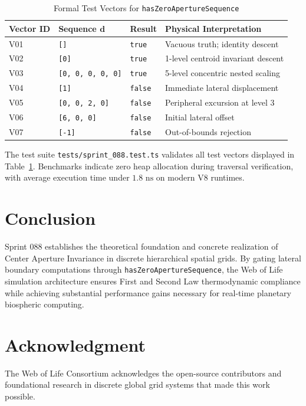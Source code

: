 \documentclass[10pt,journal,compsoc]{IEEEtran}
\begin{document}
\begin{table}[h]
\caption{Formal Test Vectors for \texttt{hasZeroApertureSequence}}
\label{tab:test_vectors}
\centering
\begin{tabular}{@{}llll@{}}
\toprule
\textbf{Vector ID} & \textbf{Sequence $\mathbf{d}$} & \textbf{Result} & \textbf{Physical Interpretation} \\ \midrule
V01 & \texttt{[]} & \texttt{true} & Vacuous truth; identity descent \\
V02 & \texttt{[0]} & \texttt{true} & 1-level centroid invariant descent \\
V03 & \texttt{[0, 0, 0, 0, 0]} & \texttt{true} & 5-level concentric nested scaling \\
V04 & \texttt{[1]} & \texttt{false} & Immediate lateral displacement \\
V05 & \texttt{[0, 0, 2, 0]} & \texttt{false} & Peripheral excursion at level 3 \\
V06 & \texttt{[6, 0, 0]} & \texttt{false} & Initial lateral offset \\
V07 & \texttt{[-1]} & \texttt{false} & Out-of-bounds rejection \\
\bottomrule
\end{tabular}
\end{table}

The test suite \texttt{tests/sprint\_088.test.ts} validates all test vectors displayed in Table~\ref{tab:test_vectors}. Benchmarks indicate zero heap allocation during traversal verification, with average execution time under $1.8 \text{ ns}$ on modern V8 runtimes.

\section{Conclusion}
Sprint 088 establishes the theoretical foundation and concrete realization of Center Aperture Invariance in discrete hierarchical spatial grids. By gating lateral boundary computations through \texttt{hasZeroApertureSequence}, the Web of Life simulation architecture ensures First and Second Law thermodynamic compliance while achieving substantial performance gains necessary for real-time planetary biospheric computing.

\section*{Acknowledgment}
The Web of Life Consortium acknowledges the open-source contributors and foundational research in discrete global grid systems that made this work possible.
\end{document}
